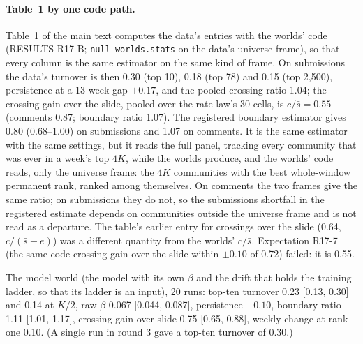 \documentclass[10pt]{article}
\begin{document}
\paragraph{Table~1 by one code path.} Table~1 of the main text computes the data's entries with the worlds' code (RESULTS R17-B; \texttt{null\_worlds.stats} on the data's universe frame), so that every column is the same estimator on the same kind of frame. On submissions the data's turnover is then 0.30 (top 10), 0.18 (top 78) and 0.15 (top 2,500), persistence at a 13-week gap $+0.17$, and the pooled crossing ratio 1.04; the crossing gain over the slide, pooled over the rate law's 30 cells, is $c/\bar s = 0.55$ (comments 0.87; boundary ratio 1.07). The registered boundary estimator gives 0.80 (0.68--1.00) on submissions and 1.07 on comments. It is the same estimator with the same settings, but it reads the full panel, tracking every community that was ever in a week's top $4K$, while the worlds produce, and the worlds' code reads, only the universe frame: the $4K$ communities with the best whole-window permanent rank, ranked among themselves. On comments the two frames give the same ratio; on submissions they do not, so the submissions shortfall in the registered estimate depends on communities outside the universe frame and is not read as a departure. The table's earlier entry for crossings over the slide (0.64, $c/(\bar s-e)$) was a different quantity from the worlds' $c/\bar s$. Expectation R17-7 (the same-code crossing gain over the slide within $\pm0.10$ of 0.72) failed: it is 0.55.

The model world (the model with its own $\beta$ and the drift that holds the training ladder, so that its ladder is an input), 20 runs: top-ten turnover 0.23 [0.13, 0.30] and 0.14 at $K/2$, raw $\beta$ 0.067 [0.044, 0.087], persistence $-0.10$, boundary ratio 1.11 [1.01, 1.17], crossing gain over slide 0.75 [0.65, 0.88], weekly change at rank one 0.10. (A single run in round 3 gave a top-ten turnover of 0.30.)
\end{document}
